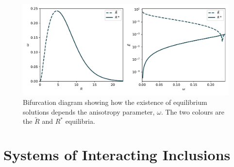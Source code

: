 \begin{figure}[h]
\centering
\includegraphics[width=12cm]{elastic_figs/bifucation_di_energy.pdf}
\caption{Bifurcation diagram showing how the existence of equilibrium solutions depends the anisotropy parameter, $\omega$. The two colours are the $\tilde{R}$ and $R^*$ equilibria.}
\label{fig:Rbifur}
\end{figure}

\section{Systems of Interacting Inclusions}

